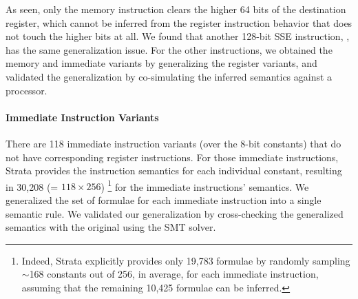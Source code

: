 \noindent As seen, only the memory instruction clears the higher 64 bits of the destination register, which cannot be inferred from the register instruction behavior that does not touch the higher bits at all.
%
We found that another 128-bit SSE instruction, , has the same generalization issue.
%
For the other instructions, we obtained the memory and immediate variants by generalizing the register variants, and validated the generalization by co-simulating the inferred semantics against a processor.


\paragraph{Immediate Instruction Variants}

There are 118 immediate instruction variants (over the 8-bit constants) that do not have corresponding register instructions.
For those immediate instructions, Strata provides the instruction semantics for each individual constant, resulting in 30,208 (= $118 \times 256$) \footnote{Indeed, Strata explicitly provides only 19,783 formulae by randomly sampling $\sim$168 constants out of 256, in average, for each immediate instruction, assuming that the remaining 10,425 formulae can be inferred.} for the immediate instructions' semantics.
We generalized the set of formulae for each immediate instruction into a single semantic rule.
We validated our generalization by cross-checking the generalized semantics with the original using the SMT solver.





